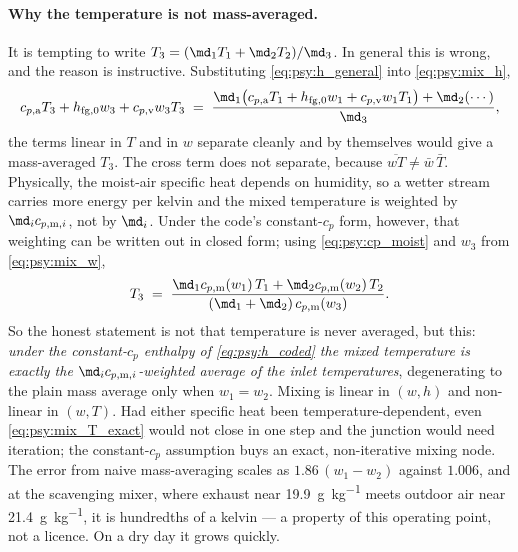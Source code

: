 \paragraph{Why the temperature is not mass-averaged.}
It is tempting to write $T_3 = (\md_1 T_1 + \md_2 T_2)/\md_3$. In general this is wrong, and the
reason is instructive. Substituting \eqref{eq:psy:h_general} into \eqref{eq:psy:mix_h},
\begin{equation*}
c_{p,\mathrm{a}} T_3 + h_{\mathrm{fg},0} w_3 + c_{p,\mathrm{v}} w_3 T_3
\;=\; \frac{\md_1\bigl(c_{p,\mathrm{a}} T_1 + h_{\mathrm{fg},0} w_1
+ c_{p,\mathrm{v}} w_1 T_1\bigr) + \md_2(\cdots)}{\md_3} ,
\end{equation*}
the terms linear in $T$ and in $w$ separate cleanly and by themselves would give a mass-averaged
$T_3$. The cross term does not separate, because $\overline{wT} \neq \bar{w}\,\bar{T}$. Physically,
the moist-air specific heat depends on humidity, so a wetter stream carries more energy per kelvin
and the mixed temperature is weighted by $\md_i c_{p,\mathrm{m},i}$, not by $\md_i$. Under the
code's constant-$c_p$ form, however, that weighting can be written out in closed form; using
\eqref{eq:psy:cp_moist} and $w_3$ from \eqref{eq:psy:mix_w},
\begin{equation}
T_3 \;=\; \frac{\md_1 c_{p,\mathrm{m}}(w_1)\,T_1 + \md_2 c_{p,\mathrm{m}}(w_2)\,T_2}
{(\md_1 + \md_2)\,c_{p,\mathrm{m}}(w_3)} . \label{eq:psy:mix_T_exact}
\end{equation}
So the honest statement is not that temperature is never averaged, but this: \emph{under the
constant-$c_p$ enthalpy of \eqref{eq:psy:h_coded} the mixed temperature is exactly the $\md_i
c_{p,\mathrm{m},i}$-weighted average of the inlet temperatures}, degenerating to the plain mass
average only when $w_1 = w_2$. Mixing is linear in $(w,h)$ and non-linear in $(w,T)$. Had either
specific heat been temperature-dependent, even \eqref{eq:psy:mix_T_exact} would not close in one
step and the junction would need iteration; the constant-$c_p$ assumption buys an exact,
non-iterative mixing node. The error from naive mass-averaging scales as $1.86\,(w_1-w_2)$ against
$1.006$, and at the scavenging mixer, where exhaust near \SI{19.9}{\gram\per\kilogram} meets outdoor
air near \SI{21.4}{\gram\per\kilogram}, it is hundredths of a kelvin --- a property of this
operating point, not a licence. On a dry day it grows quickly.

